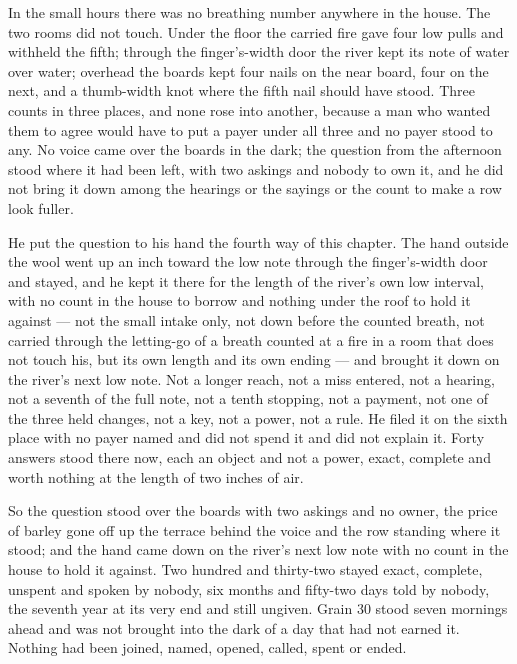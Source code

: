 In the small hours there was no breathing number anywhere in the house. The two rooms did not touch. Under the floor the carried fire gave four low pulls and withheld the fifth; through the finger's-width door the river kept its note of water over water; overhead the boards kept four nails on the near board, four on the next, and a thumb-width knot where the fifth nail should have stood. Three counts in three places, and none rose into another, because a man who wanted them to agree would have to put a payer under all three and no payer stood to any. No voice came over the boards in the dark; the question from the afternoon stood where it had been left, with two askings and nobody to own it, and he did not bring it down among the hearings or the sayings or the count to make a row look fuller.

He put the question to his hand the fourth way of this chapter. The hand outside the wool went up an inch toward the low note through the finger's-width door and stayed, and he kept it there for the length of the river's own low interval, with no count in the house to borrow and nothing under the roof to hold it against --- not the small intake only, not down before the counted breath, not carried through the letting-go of a breath counted at a fire in a room that does not touch his, but its own length and its own ending --- and brought it down on the river's next low note. Not a longer reach, not a miss entered, not a hearing, not a seventh of the full note, not a tenth stopping, not a payment, not one of the three held changes, not a key, not a power, not a rule. He filed it on the sixth place with no payer named and did not spend it and did not explain it. Forty answers stood there now, each an object and not a power, exact, complete and worth nothing at the length of two inches of air.

So the question stood over the boards with two askings and no owner, the price of barley gone off up the terrace behind the voice and the row standing where it stood; and the hand came down on the river's next low note with no count in the house to hold it against. Two hundred and thirty-two stayed exact, complete, unspent and spoken by nobody, six months and fifty-two days told by nobody, the seventh year at its very end and still ungiven. Grain 30 stood seven mornings ahead and was not brought into the dark of a day that had not earned it. Nothing had been joined, named, opened, called, spent or ended.
